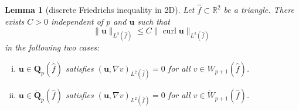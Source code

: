 \documentclass{article}
\newtheorem{lemma}[theorem]{Lemma}
\begin{document}
\begin{lemma}
[discrete Friedrichs inequality in 2D]\label{lemma:discrete-friedrichs} 
Let $\widehat f \subset {\mathbb R}^2$ be a triangle. 
There exists $C > 0$ independent of $p$
and ${\mathbf{u}}$ such that
\begin{equation}
\label{eq:lemma:discrete-friedrichs-2d}\|{\mathbf{u}}\|_{L^{2}(\widehat{f})} \leq C
\|\operatorname{curl} {\mathbf{u}}\|_{L^{2}(\widehat{f})}%
\end{equation}
in the following two cases:

\begin{enumerate}
[(i)]

\item \label{item:lemma:discrete-friedrichs-i} ${\mathbf{u}}\in
\mathbf{Q}_{p}(\widehat{f})$ satisfies $({\mathbf{u}%
},\nabla v)_{L^{2}(\widehat{f})}=0$ for all $v\in W_{p+1}(\widehat{f})$.

\item \label{item:lemma:discrete-friedrichs-ii} ${\mathbf{u}} \in
\mathring{\mathbf{Q}}_p(\widehat{f})$ satisfies $({\mathbf{u}}, \nabla v)_{L^{2}(\widehat{f})} = 0$
for all $v \in\mathring{W}_{p+1}(\widehat{f})$.
\end{enumerate}
\end{lemma}
\end{document}
